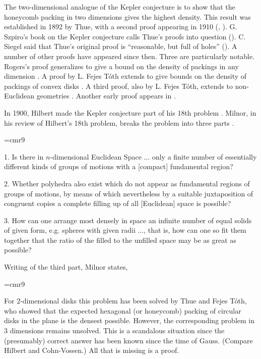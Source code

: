 The two-dimensional analogue of the Kepler conjecture is to show
that the honeycomb packing in two dimensions gives the highest
density.  This result was established in 1892 by Thue, with a second
proof appearing in 1910 (\cite{Thu92}, \cite{Thu10}). G. Szpiro's
book on the Kepler conjecture calls Thue's proofs into question
(\cite{Szp02}).  C. Siegel said that Thue's original proof is
``reasonable, but full of holes'' (\cite{Szp02}). A number of other
proofs have appeared since then. Three are particularly notable.
Rogers's proof generalizes to give a bound on the density of
packings in any dimension \cite{Rog58}. A proof by L. Fejes T\'oth
extends to give bounds on the density of packings of convex disks
\cite{Fej50}. A third proof, also by L. Fejes T\'oth, extends to
non-Euclidean geometries \cite{Fej53}. Another early proof appears
in \cite{SeM44}.

In 1900, Hilbert made the Kepler conjecture part of his 18th
problem \cite{hilbert}. Milnor, in his review of Hilbert's 18th
problem, breaks the problem into three parts \cite{Mil76}.

{
\narrower
\font\ninerm=cmr9
\ninerm

1.  Is there in $n$-dimensional Euclidean Space $\ldots$ only a finite
number of essentially different kinds of groups of motions with a
[compact] fundamental region?

2.  Whether polyhedra also exist which do not appear as fundamental
    regions of groups of motions, by means of which nevertheless
    by a suitable juxtaposition of congruent copies a complete filling
    up of all [Euclidean] space is possible?

3.  How can one arrange most densely in space an infinite number
    of equal solids of given form, e.g. spheres with given radii $\ldots$,
    that is, how can one so fit them together that the ratio of the
    filled to the unfilled space may be as great as possible?

}

\smallskip
Writing of the third part, Milnor states,

{
\narrower
\font\ninerm=cmr9
\ninerm

For $2$-dimensional disks this problem has been solved by Thue and
Fejes T\'oth, who showed that the expected hexagonal (or honeycomb)
packing of circular disks in the plane is the densest possible.
However, the corresponding problem in $3$ dimensions remains
unsolved. This is a scandalous situation since the (presumably)
correct answer has been known since the time of Gauss. (Compare
Hilbert and Cohn-Vossen.)  All that is missing is a proof.

}

